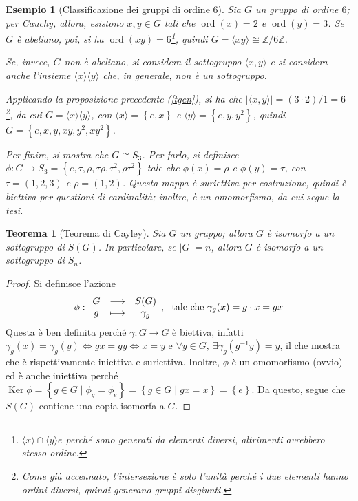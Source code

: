 \documentclass[11pt]{article}
\theoremstyle{style}
\newtheorem{esempio}{Esempio}[section]
\newtheorem{teorema}{Teorema}[section]
\numberwithin{equation}{subsection}
\begin{document}
\begin{esempio}[Classificazione dei gruppi di ordine 6]
Sia $G$ un gruppo di ordine $6$; per Cauchy, allora, esistono $x,y \in G$ tali che $\operatorname{ord}(x) = 2$ e $\operatorname{ord}(y) =3$. 
Se $G$ \`e abeliano, poi, si ha $\operatorname{ord}(xy) = 6$\footnote{$\langle x \rangle \cap \langle y \rangle e$ perch\'e sono generati da elementi diversi, altrimenti avrebbero stesso ordine.}, quindi $G = \langle xy \rangle\cong \mathbb{Z}/ 6\mathbb{Z}$.

Se, invece, $G$ non \`e abeliano, si considera il sottogruppo $\langle x,y \rangle$ e si considera anche l'insieme $\langle x \rangle\langle y \rangle$ che, in generale, non \`e un sottogruppo.

Applicando la proposizione precedente (\ref{tgen}), si ha che $\lvert \langle x,y \rangle \rvert = (3 \cdot 2) / 1= 6$\footnote{Come gi\`a accennato, l'intersezione \`e solo l'unit\`a perch\'e i due elementi hanno ordini diversi, quindi generano gruppi disgiunti.}, da cui $G = \langle x \rangle\langle y \rangle$, con $\langle x \rangle= \left\{ e,x \right\} $ e $\langle y \rangle= \left\{ e,y,y^2 \right\} $, quindi $G = \left\{ e , x ,y, xy,y^2 , xy^2 \right\} $.

Per finire, si mostra che $G \cong S_3$. 
Per farlo, si definisce $\phi :G \to S_3=\left\{ e,\tau ,\rho ,\tau \rho ,\tau ^2,\rho \tau ^2 \right\} $ tale che $\phi (x) = \rho $ e $\phi (y) = \tau $, con $\tau =(1,2,3)$ e $\rho = (1,2)$.
Questa mappa \`e suriettiva per costruzione, quindi \`e biettiva per questioni di cardinalit\`a; inoltre, \`e un omomorfismo, da cui segue la tesi.
\end{esempio}

\begin{teorema}
	[Teorema di Cayley]
	Sia $G$ un gruppo; allora $G$ \`e isomorfo a un sottogruppo di $S(G)$.
	In particolare, se $|G| = n$, allora $G$ \`e isomorfo a un sottogruppo di $S_n$.
\end{teorema}
	\begin{proof}
		Si definisce l'azione
		\[
		\phi : 
		\begin{array}
			{c c c}
			G & \longrightarrow & S(G)\\
			g & \longmapsto & \gamma_g
		\end{array}, \ \text{ tale che } \gamma_g(x) = g\cdot  x=gx
		\] 
		Questa \`e ben definita perch\'e $\gamma:G \to G$ \`e biettiva, infatti $\gamma_g(x) = \gamma_g(y) \iff g x = g y \iff x = y$ e $\forall y \in G , \ \exists \gamma_g(g^{-1} y) = y $, il che mostra che \`e rispettivamente iniettiva e suriettiva.
		Inoltre, $\phi $ \`e un omomorfismo (ovvio) ed \`e anche iniettiva perch\'e $\operatorname{Ker} \phi = \left\{ g \in G  \mid \phi _g = \phi _e \right\} = \left\{ g \in G  \mid g x = x \right\} = \left\{ e \right\}$.
		Da questo, segue che $S(G)$ contiene una copia isomorfa a $G$.
	\end{proof}
\end{document}
